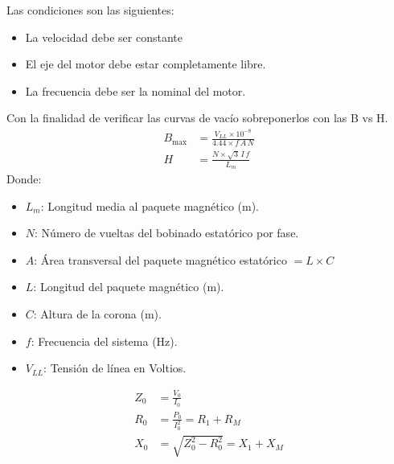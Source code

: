 \documentclass[a4paper,12pt]{article}
\begin{document}
Las condiciones son las siguientes:
\begin{itemize}
    \item La velocidad debe ser constante
    \item El eje del motor debe estar completamente libre.
    \item La frecuencia debe ser la nominal del motor.
\end{itemize}
Con la finalidad de verificar las curvas de vacío sobreponerlos con las B vs H.
\begin{align}
    B_{\max} &= \frac{V_{LL}\times 10^{-8}}{4.44\times f\, A\, N}\\
    H &= \frac{N\times \sqrt{3}\, I \, f}{L_{m}}
\end{align}
Donde:
\begin{itemize}
    \item $L_{m}$: Longitud media al paquete magnético (m).
    \item $N$: Número de vueltas del bobinado estatórico por fase.
    \item $A$: Área transversal del paquete magnético estatórico $= L\times C$
    \item $L$: Longitud del paquete magnético (m).
    \item $C$: Altura de la corona (m).
    \item $f$: Frecuencia del sistema (Hz).
    \item $V_{LL}$: Tensión de línea en Voltios.
\end{itemize}
\begin{align}
    Z_{0} &= \frac{V_{0}}{I_{0}}\\
    R_{0} &= \frac{P_{0}}{I^{2}_{0}} = R_{1} + R_{M}\\
    X_{0} &= \sqrt{Z^{2}_{0} - R^{2}_{0}} = X_{1} + X_{M}
\end{align}
\end{document}
